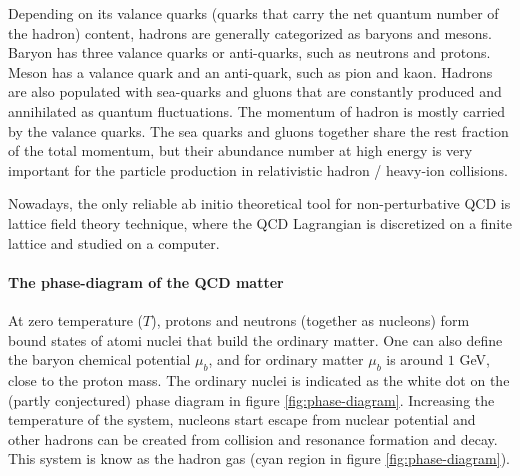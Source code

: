 Depending on its valance quarks (quarks that carry the net quantum number of the hadron) content, hadrons are generally categorized as baryons and mesons.
Baryon has three valance quarks or anti-quarks, such as neutrons and protons.
Meson has a valance quark and an anti-quark, such as pion and kaon.
Hadrons are also populated with sea-quarks and gluons that are constantly produced and annihilated as quantum fluctuations.
The momentum of hadron is mostly carried by the valance quarks.
The sea quarks and gluons together share the rest fraction of the total momentum, but their abundance number at high energy is very important for the particle production in relativistic hadron / heavy-ion collisions.

Nowadays, the only reliable ab initio theoretical tool for non-perturbative QCD is lattice field theory technique, where the QCD Lagrangian is discretized on a finite lattice and studied on a computer.

\paragraph{The phase-diagram of the QCD matter}
At zero temperature ($T$), protons and neutrons (together as nucleons) form bound states of atomi nuclei that build the ordinary matter.
One can also define the baryon chemical potential $\mu_b$, and for ordinary matter $\mu_b$ is around $1$ GeV, close to the proton mass.
The ordinary nuclei is indicated as the white dot on the (partly conjectured) phase diagram in figure \ref{fig:phase-diagram}.
Increasing the temperature of the system, nucleons start escape from nuclear potential and other hadrons can be created from collision and resonance formation and decay.
This system is know as the hadron gas (cyan region in figure \ref{fig:phase-diagram}).

